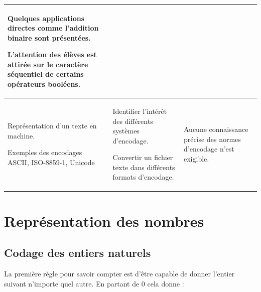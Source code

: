 {\begin{tabular}{|L{3cm}|L{5.5cm}|L{6cm}|}
Quelques applications directes comme l'addition binaire sont présentées.

L'attention des élèves est attirée sur le caractère séquentiel de certains opérateurs booléens.\\ \hline
Représentation d'un texte en machine.

Exemples des encodages ASCII, ISO-8859-1, Unicode
&
Identifier l'intérêt des différents systèmes d'encodage.

Convertir un fichier texte dans différents formats d'encodage.
&
Aucune connaissance précise des normes d'encodage n'est exigible.\\ \hline
\end{tabular}\par}


\chapter{Représentation des nombres}

\section{Codage des entiers naturels}

La première règle pour savoir compter est d'être capable de donner l'entier suivant n'importe quel autre. En partant de 0 cela donne :

